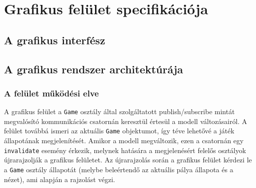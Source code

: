

\usepackage{enumitem}
\usepackage{textcomp}
\usepackage[utf8]{inputenc}
\usepackage[T1]{fontenc}



\fedlap

\addtocounter{section}{10}
\section{Grafikus felület specifikációja}

	\subsection{A grafikus interfész}

		\subsection{A grafikus rendszer architektúrája}
		
		\subsubsection{A felület működési elve}
		A grafikus felület a \texttt{Game} osztály által szolgáltatott publish/subscribe mintát megvalósító kommunikációs csatornán keresztül értesül a modell változásairól. A felület továbbá ismeri az aktuális \texttt{Game} objektumot, így téve lehetővé a játék állapotának megjelenítését. Amikor a modell megváltozik, ezen a csatornán egy \texttt{invalidate} esemény érkezik, melynek hatására a megjelenésért felelős osztályok újrarajzolják a grafikus felületet. Az újrarajzolás során a grafikus felület kérdezi le a \texttt{Game} osztály állapotát (melybe beleértendő az aktuális pálya állapota és a nézet), ami alapján a rajzolást végzi.
		
